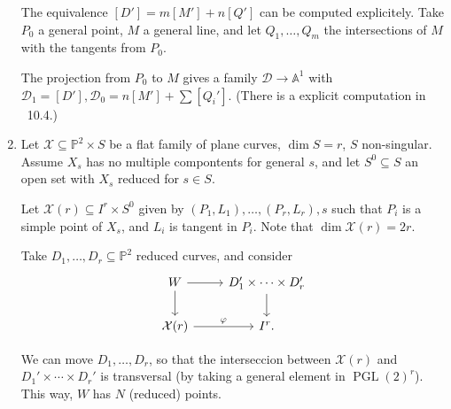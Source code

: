 \documentclass[leqno, openany]{memoir}
\theoremstyle{definition}
\theoremstyle{remark}
\theoremstyle{plain}
\theoremstyle{definition}
\theoremstyle{remark}
\renewcommand{\P}{\mathbb{P}}
\newcommand{\mc}[1]{\mathcal{#1}}
\begin{document}
\begin{enumerate}
The equivalence $[D']=m[M']+n[Q']$ can be computed explicitely. Take $P_0$ a general point, $M$ a general line, and let $Q_1, \dots, Q_m$ the intersections of $M$ with the tangents from $P_0$.
\begin{figure}[H]
\centering
{}
\end{figure}

The projection from $P_0$ to $M$ gives a family $\mathcal{D} \to \mathbb{A}^1$ with $\mathcal{D}_1=[D'], \mathcal{D}_0 = n[M']+\sum [Q_i']$. (There is a explicit computation in \textsection~10.4.) 
    \item Let $\mathcal{X} \subseteq \P^2 \times S$ be a flat family of plane curves, $\dim S=r$, $S$ non-singular. Assume $X_s$ has no multiple compontents for general $s$, and let $S^0 \subseteq S$ an open set with $X_s$ reduced for $s \in S$. 

Let $\mc{X}(r)\subseteq I^r \times S^0$ given by $(P_1, L_1), \dots, (P_r, L_r), s$ such that $P_i$ is a simple point of $X_s$, and $L_i$ is tangent in $P_i$. Note that $\dim \mc{X}(r)=2r$.

Take $D_1, \dots, D_r \subseteq \P^2$ reduced curves, and consider
\[ \begin{tikzcd} W \arrow[r] \arrow[d] & D_1' \times \cdots \times D_r' \arrow[d] \\ \mc{X}(r) \arrow[r, "\varphi"] & I^r. \end{tikzcd} \]

We can move $D_1, \dots, D_r$, so that the interseccion between $\mc{X}(r)$ and $D_1' \times \cdots \times D_r'$ is transversal (by taking a general element in ${ \operatorname{PGL}(2) }^r$). This way, $W$ has $N$ (reduced) points. 


\end{enumerate}
\end{document}
